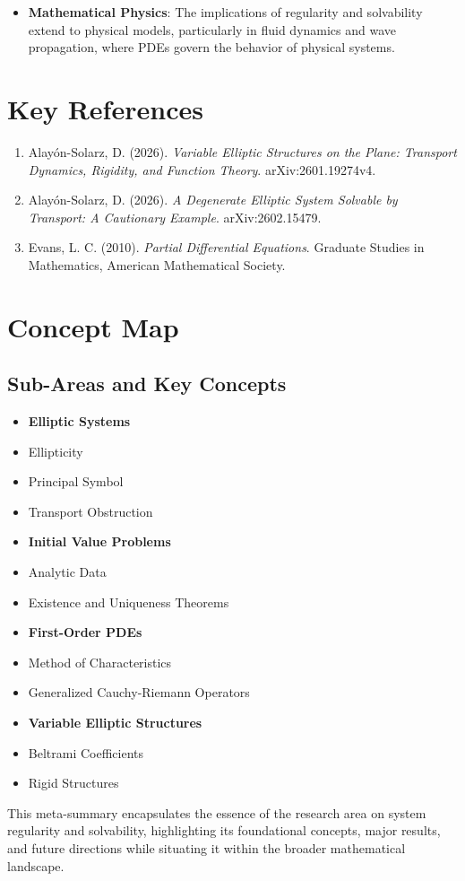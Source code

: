 \documentclass[11pt,a4paper]{article}
\begin{document}
\begin{itemize}
\item \textbf{Mathematical Physics}: The implications of regularity and solvability extend to physical models, particularly in fluid dynamics and wave propagation, where PDEs govern the behavior of physical systems.
\end{itemize}

\section{Key References}
\begin{enumerate}
\item Alayón-Solarz, D. (2026). \textit{Variable Elliptic Structures on the Plane: Transport Dynamics, Rigidity, and Function Theory}. arXiv:2601.19274v4.
\item Alayón-Solarz, D. (2026). \textit{A Degenerate Elliptic System Solvable by Transport: A Cautionary Example}. arXiv:2602.15479.
\item Evans, L. C. (2010). \textit{Partial Differential Equations}. Graduate Studies in Mathematics, American Mathematical Society.
\end{enumerate}

\section{Concept Map}
\subsection{Sub-Areas and Key Concepts}
\begin{itemize}
\item \textbf{Elliptic Systems}
\item Ellipticity
\item Principal Symbol
\item Transport Obstruction
\item \textbf{Initial Value Problems}
\item Analytic Data
\item Existence and Uniqueness Theorems
\item \textbf{First-Order PDEs}
\item Method of Characteristics
\item Generalized Cauchy-Riemann Operators
\item \textbf{Variable Elliptic Structures}
\item Beltrami Coefficients
\item Rigid Structures
\end{itemize}

This meta-summary encapsulates the essence of the research area on system regularity and solvability, highlighting its foundational concepts, major results, and future directions while situating it within the broader mathematical landscape.
\end{document}
